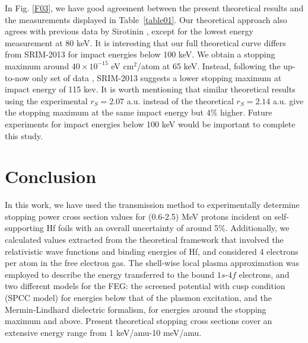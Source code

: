 \documentclass[aps,pra,reprint,groupedaddress]{revtex4-1}
\begin{document}
In Fig. \ref{F03}, we have good agreement between the present theoretical results and the measurements displayed in Table~\ref{table01}. Our theoretical approach also agrees with previous data by Sirotinin \cite{Sirotinin}, except for the lowest energy measurement at 80 keV. It is interesting that our full theoretical curve differs from SRIM-2013 for impact energies below 100 keV. We obtain a stopping maximum around $40 \times 10^{-15}$ eV cm$^2$/atom  at 65 keV. Instead, following the up-to-now only set of data \cite{Sirotinin}, SRIM-2013 suggests a lower stopping maximum  at impact energy of 115 kev. It is worth mentioning that similar theoretical results using the experimental $r_S=2.07$ a.u. instead of the theoretical $r_S=2.14$ a.u. give the stopping maximum at the same impact energy but $4\%$ higher. Future experiments for
impact energies below 100 keV would be important to complete this study.


\section{Conclusion}
\label{conclusion}
In this work, we have used the transmission method to experimentally determine stopping power cross section values for (0.6-2.5) MeV protons incident on self-supporting Hf foils with an overall uncertainty of around 5\%. Additionally, we calculated values extracted from the theoretical framework that involved the relativistic wave functions and binding energies of Hf, and considered 4 electrons per atom in the free electron gas. The shell-wise local plasma approximation was employed to describe the energy transferred to the bound $1s$-$4f$ electrons, and two different models for the FEG: the screened potential with cusp condition (SPCC model) for energies below that of the plasmon excitation, and the Mermin-Lindhard dielectric formalism, for energies around the stopping maximum and above. Present theoretical stopping cross sections cover an extensive energy range from 1 keV/amu-10 meV/amu.
\end{document}
